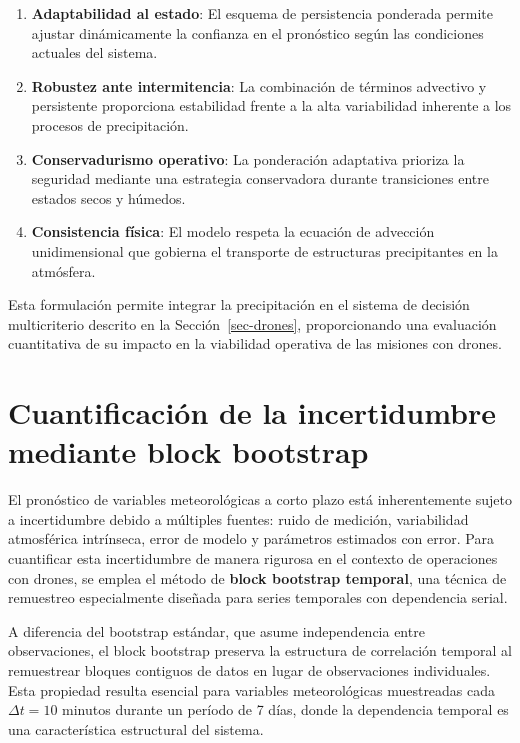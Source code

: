 \documentclass[
  spanish,
  us-letterpaper,
]{scrreprt}
\numberwithin{equation}{section}
\begin{document}
\begin{enumerate}
\def\labelenumi{\arabic{enumi}.}
\item
  \textbf{Adaptabilidad al estado}: El esquema de persistencia ponderada
  permite ajustar dinámicamente la confianza en el pronóstico según las
  condiciones actuales del sistema.
\item
  \textbf{Robustez ante intermitencia}: La combinación de términos
  advectivo y persistente proporciona estabilidad frente a la alta
  variabilidad inherente a los procesos de precipitación.
\item
  \textbf{Conservadurismo operativo}: La ponderación adaptativa prioriza
  la seguridad mediante una estrategia conservadora durante transiciones
  entre estados secos y húmedos.
\item
  \textbf{Consistencia física}: El modelo respeta la ecuación de
  advección unidimensional que gobierna el transporte de estructuras
  precipitantes en la atmósfera.
\end{enumerate}

Esta formulación permite integrar la precipitación en el sistema de
decisión multicriterio descrito en la Sección~\ref{sec-drones},
proporcionando una evaluación cuantitativa de su impacto en la
viabilidad operativa de las misiones con drones.

\section{Cuantificación de la incertidumbre mediante block
bootstrap}\label{sec-cuantificacionbotstrap}

El pronóstico de variables meteorológicas a corto plazo está
inherentemente sujeto a incertidumbre debido a múltiples fuentes: ruido
de medición, variabilidad atmosférica intrínseca, error de modelo y
parámetros estimados con error. Para cuantificar esta incertidumbre de
manera rigurosa en el contexto de operaciones con drones, se emplea el
método de \textbf{block bootstrap temporal}, una técnica de remuestreo
especialmente diseñada para series temporales con dependencia serial.

A diferencia del bootstrap estándar, que asume independencia entre
observaciones, el block bootstrap preserva la estructura de correlación
temporal al remuestrear bloques contiguos de datos en lugar de
observaciones individuales. Esta propiedad resulta esencial para
variables meteorológicas muestreadas cada \(\Delta t = 10\) minutos
durante un período de 7 días, donde la dependencia temporal es una
característica estructural del sistema.
\end{document}
